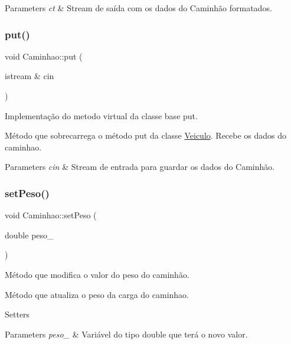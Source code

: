 \begin{DoxyParams}{Parameters}
{\em ct} & Stream de saída com os dados do Caminhão formatados. \\
\hline
\end{DoxyParams}
\mbox{\label{classCaminhao_a80131907cd5b7ef1d138e70dba4b0c0d}} 
\subsubsection{\texorpdfstring{put()}{put()}}
{\footnotesize\ttfamily void Caminhao\+::put (\begin{DoxyParamCaption}\item[{istream \&}]{cin }\end{DoxyParamCaption})}



Implementação do metodo virtual da classe base \textquotesingle{}put\textquotesingle{}. 

Método que sobrecarrega o método put da classe \hyperlink{classVeiculo}{Veiculo}. Recebe os dados do caminhao.


\begin{DoxyParams}{Parameters}
{\em cin} & Stream de entrada para guardar os dados do Caminhão. \\
\hline
\end{DoxyParams}
\mbox{\label{classCaminhao_a744ca750962ca3fbabe6caeb2ccd7e02}} 
\subsubsection{\texorpdfstring{set\+Peso()}{setPeso()}}
{\footnotesize\ttfamily void Caminhao\+::set\+Peso (\begin{DoxyParamCaption}\item[{double}]{peso\+\_\+ }\end{DoxyParamCaption})}



Método que modifica o valor do peso do caminhão. 

Método que atualiza o peso da carga do caminhao.

Setters 
\begin{DoxyParams}{Parameters}
{\em peso\+\_\+} & Variável do tipo double que terá o novo valor. \\
\hline
\end{DoxyParams}
\mbox{\label{classCaminhao_aabcf701d339872da35d7a2948b474ec3}} 
